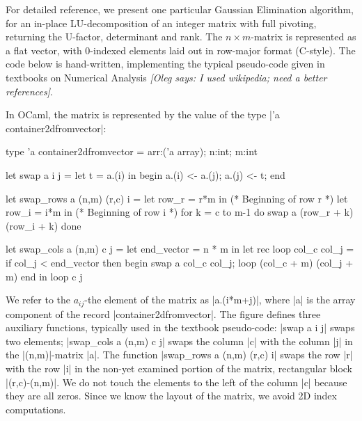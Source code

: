 \documentclass{elsart}
\newcommand{\oleg}[1]{{\it [Oleg says: #1]}}
\begin{document}
For detailed reference, we present one particular Gaussian Elimination
algorithm, for an in-place LU-decomposition of an integer matrix with
full pivoting, returning the U-factor, determinant and rank. The
$n\times m$-matrix is represented as a flat vector, with 0-indexed
elements laid out in row-major format (C-style). The code below is
hand-written, implementing the typical pseudo-code given in textbooks on
Numerical Analysis \oleg{I used wikipedia; need a better references}.

In OCaml, the matrix is represented by the value of the type
|'a container2dfromvector|:
\begin{code}
type 'a container2dfromvector = {arr:('a array); n:int; m:int}

let swap a i j =
    let t = a.(i) in begin a.(i) <- a.(j); a.(j) <- t; end

let swap_rows a (n,m) (r,c) i =
  let row_r = r*m in			(* Beginning of row r *)
  let row_i = i*m in 			(* Beginning of row i *)
  for k = c to m-1 do
      swap a (row_r + k) (row_i + k)
  done

let swap_cols a (n,m) c j =
  let end_vector = n * m in
  let rec loop col_c col_j =
    if col_j < end_vector then
      begin
        swap a col_c col_j;
        loop (col_c + m) (col_j + m)
      end
  in loop c j
\end{code}
We refer to the $a_{ij}$-the element of the matrix as |a.(i*m+j)|,
where |a| is the array component of the record |container2dfromvector|.
The figure defines three auxiliary functions, typically used in the
textbook pseudo-code: |swap a i j| swaps two elements; 
|swap_cols a (n,m) c j| swaps the column |c| with the column |j| in
the |(n,m)|-matrix |a|. The function 
|swap_rows a (n,m) (r,c) i| swaps the row |r| with the row |i| in 
the non-yet examined portion of the matrix, 
rectangular block |(r,c)-(n,m)|. We do not touch the 
elements to the left of the column |c| because they are all zeros. 
Since we know the layout of the matrix, we avoid 2D index
computations.
\end{document}
